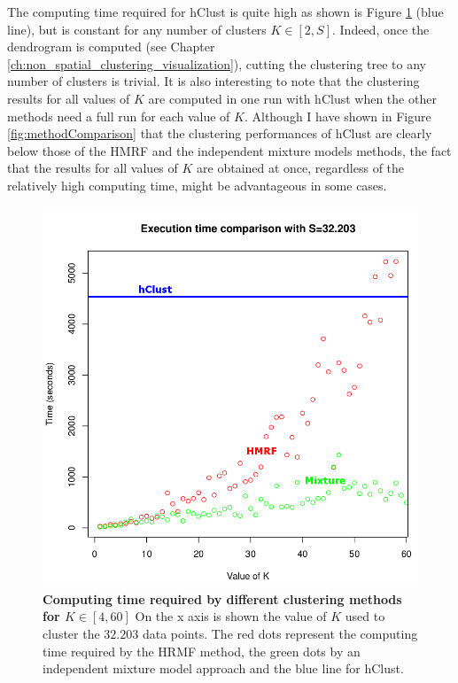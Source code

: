 	The computing time required for hClust is quite high as shown is Figure \ref{fig:computing_time} (blue line), but is constant for any number of clusters $K \in [2,S]$. Indeed, once the dendrogram is computed (see Chapter \ref{ch:non_spatial_clustering_visualization}), cutting the clustering tree to any number of clusters is trivial. It is also interesting to note that the clustering results for all values of $K$ are computed in one run with hClust when the other methods need a full run for each value of $K$. Although I have shown in Figure \ref{fig:methodComparison} that the clustering performances of hClust are clearly below those of the HMRF and the independent mixture models methods, the fact that the results for all values of $K$ are obtained at once, regardless of the relatively high computing time, might be advantageous in some cases. 
	
	\begin{figure}[h]
\centerline{\includegraphics[width=0.8\linewidth]{gfx/chapter5/exec_time.png}}
\caption{{\bf Computing time required by different clustering methods for $K \in [4,60]$} On the x axis is shown the value of $K$ used to cluster the $32.203$ data points. The red dots represent the computing time required by the HRMF method, the green dots by an independent mixture model approach and the blue line for hClust.}
\label{fig:computing_time}
	\end{figure}
	
